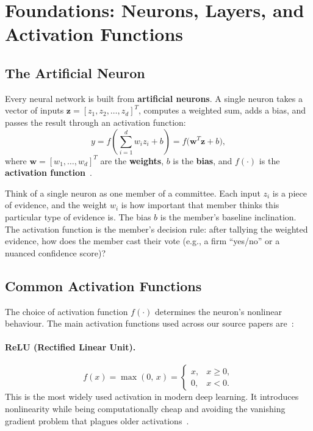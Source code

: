 \section{Foundations: Neurons, Layers, and Activation Functions}
\label{sec:foundations}

\subsection{The Artificial Neuron}

Every neural network is built from \textbf{artificial neurons}.
A single neuron takes a vector of inputs
$\bm{z} = [z_1, z_2, \dots, z_d]^T$, computes a weighted sum,
adds a bias, and passes the result through an activation function:
\begin{equation}
    y = f\!\left(\sum_{i=1}^{d} w_i z_i + b\right) = f\!\bigl(\bm{w}^T\bm{z} + b\bigr),
    \label{eq:single_neuron}
\end{equation}
where $\bm{w} = [w_1, \dots, w_d]^T$ are the \textbf{weights},
$b$ is the \textbf{bias}, and $f(\cdot)$ is the \textbf{activation
function}~\cite{da2024survey}.

\begin{workingexample}
    Think of a single neuron as one member of a committee.
    Each input $z_i$ is a piece of evidence, and the weight $w_i$ is
    how important that member thinks this particular type of evidence is.
    The bias $b$ is the member's baseline inclination.  The activation
    function is the member's decision rule: after tallying the weighted
    evidence, how does the member cast their vote (e.g., a firm ``yes/no''
    or a nuanced confidence score)?
\end{workingexample}

\subsection{Common Activation Functions}

The choice of activation function $f(\cdot)$ determines the neuron's
nonlinear behaviour.  The main activation functions used across our source
papers are~\cite{da2024survey,kim2017novel,zou2021novel}:

\paragraph{ReLU (Rectified Linear Unit).}
\begin{equation}
    f(x) = \max(0,\, x) =
    \begin{cases}
        x, & x \ge 0, \\
        0, & x < 0.
    \end{cases}
    \label{eq:relu}
\end{equation}
This is the most widely used activation in modern deep learning.
It introduces nonlinearity while being computationally cheap and avoiding
the vanishing gradient problem that plagues older
activations~\cite{da2024survey}.

